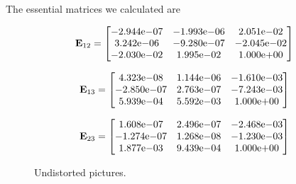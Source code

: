 \documentclass[10pt,twocolumn,letterpaper]{article}
\begin{document}
The essential matrices we calculated are

$$\textbf{E}_{12} =
\begin{bmatrix}
-2.944{\text e-}07&-1.993{\text e-}06&2.051{\text e-}02\\
3.242{\text e-}06&-9.280{\text e-}07&-2.045{\text e-}02\\
-2.030{\text e-}02&1.995{\text e-}02&1.000{\text e+}00 
\end{bmatrix}
$$

$$\textbf{E}_{13} =
\begin{bmatrix}
4.323{\text e-}08&1.144{\text e-}06&-1.610{\text e-}03\\
-2.850{\text e-}07&2.763{\text e-}07&-7.243{\text e-}03\\
5.939{\text e-}04&5.592{\text e-}03&1.000{\text e+}00
\end{bmatrix}
$$

$$\textbf{E}_{23} =
\begin{bmatrix}
1.608{\text e-}07&2.496{\text e-}07&-2.468{\text e-}03\\
-1.274{\text e-}07&1.268{\text e-}08&-1.230{\text e-}03\\
1.877{\text e-}03&9.439{\text e-}04&1.000{\text e+}00
\end{bmatrix}
$$


\begin{figure}[t]
\centering
{}

\caption{Undistorted pictures.}
\label{fig:undistorted}
\end{figure}
\end{document}

